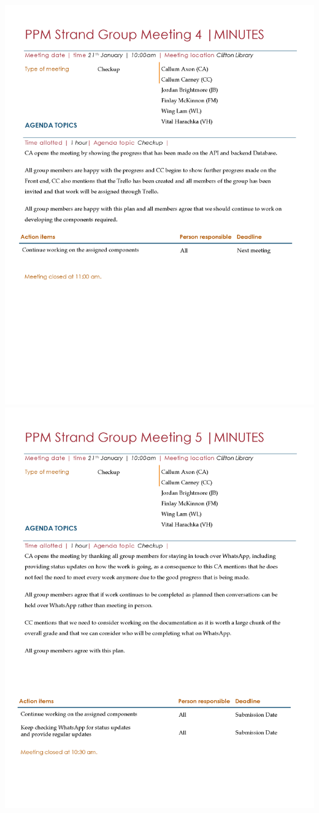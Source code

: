 \documentclass[
  english,
  a4paper,
,tablecaptionabove
]{scrartcl}
\begin{document}
\includegraphics{images/ppm-images/meeting-4.png} \newpage
\includegraphics{images/ppm-images/meeting-5.png} \newpage
\end{document}
